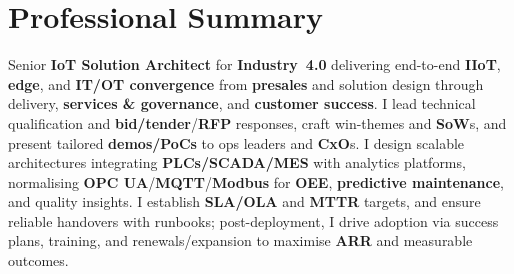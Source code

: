 \documentclass[11pt,a4paper,sans]{moderncv} %
\newcommand{\atsinvisible}[1]{%
  \makebox[0pt][l]{\textcolor{white}{#1}}%
}
\newcommand{\kw}[1]{\textbf{#1}}
\begin{document}
\makecvtitle
\atsinvisible{LinkedIn:https://www.linkedin.com/in/ankitseal}
\atsinvisible{Github:https://github.com/ankitseal}
\vspace*{-1.5\baselineskip} %

\section{Professional Summary}
\begin{justify}
Senior \kw{IoT Solution Architect} for \kw{Industry~4.0} delivering end-to-end \kw{IIoT}, \kw{edge}, and \kw{IT/OT convergence} from \kw{presales} and solution design through delivery, \kw{services \& governance}, and \kw{customer success}. I lead technical qualification and \kw{bid/tender}/\kw{RFP} responses, craft win-themes and \kw{SoW}s, and present tailored \kw{demos/PoCs} to ops leaders and \kw{CxO}s. I design scalable architectures integrating \kw{PLCs/SCADA/MES} with analytics platforms, normalising \kw{OPC UA}/\kw{MQTT}/\kw{Modbus} for \kw{OEE}, \kw{predictive maintenance}, and quality insights. I establish \kw{SLA/OLA} and \kw{MTTR} targets, and ensure reliable handovers with runbooks; post-deployment, I drive adoption via success plans, training, and renewals/expansion to maximise \kw{ARR} and measurable outcomes.
\end{justify}


\end{document}
